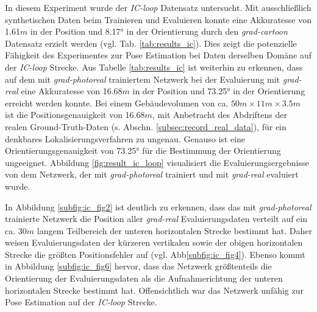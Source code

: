 
In diesem Experiment wurde der \textit{IC-loop} Datensatz untersucht. 
Mit ausschließlich synthetischen Daten beim Trainieren und Evaluieren konnte eine Akkuratesse von 1.61$m$ in der Position und 8.17° in der Orientierung durch den \textit{grad-cartoon} Datensatz erzielt werden (vgl. Tab. \ref{tab:results_ic}). Dies zeigt die potenzielle Fähigkeit des Experimentes zur Pose Estimation bei Daten derselben Domäne auf der \textit{IC-loop} Strecke. Aus Tabelle \ref{tab:results_ic} ist weiterhin zu erkennen, dass auf dem mit \textit{grad-photoreal} trainiertem Netzwerk bei der Evaluierung mit \textit{grad-real} eine Akkuratesse von 16.68$m$ in der Position und 73.25° in der Orientierung erreicht werden konnte. Bei einem Gebäudevolumen von ca. $50m \times 11m \times 3.5m$ ist die Positionsgenauigkeit von 16.68$m$, mit Anbetracht des Abdriftens der realen Ground-Truth-Daten (s. Abschn. \ref{subsec:record_real_data}), für ein denkbares Lokalisierungsverfahren zu ungenau. Genauso ist eine Orientierungsgenauigkeit von 73.25° für die Bestimmung der Orientierung ungeeignet. Abbildung \ref{fig:result_ic_loop} visualisiert die Evaluierungsergebnisse von dem Netzwerk, der mit \textit{grad-photoreal} trainiert und mit \textit{grad-real} evaluiert wurde.

In Abbildung \ref{subfig:ic_fig2} ist deutlich zu erkennen, dass das mit \textit{grad-photoreal} trainierte Netzwerk die Position aller \textit{grad-real} Evaluierungsdaten verteilt auf ein ca. 30$m$ langem Teilbereich der unteren horizontalen Strecke bestimmt hat. Daher weisen Evaluierungsdaten der kürzeren vertikalen sowie der obigen horizontalen Strecke die größten Positionsfehler auf (vgl. Abb\ref{subfig:ic_fig4}). Ebenso kommt in Abbildung \ref{subfig:ic_fig6} hervor, dass das Netzwerk größtenteils die Orientierung der Evaluierungsdaten als die Aufnahmerichtung der unteren horizontalen Strecke bestimmt hat. Offensichtlich war das Netzwerk unfähig zur Pose Estimation auf der \textit{IC-loop} Strecke.

